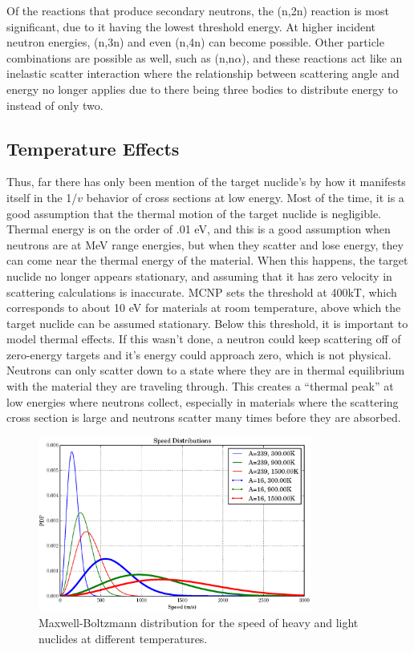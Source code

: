 Of the reactions that produce secondary neutrons, the (n,2n) reaction is most significant, due to it having the lowest threshold energy.  At higher incident neutron energies, (n,3n) and even (n,4n) can become possible.  Other particle combinations are possible as well, such as (n,n$\alpha$), and these reactions act like an inelastic scatter interaction where the relationship between scattering angle and energy no longer applies due to there being three bodies to distribute energy to instead of only two.

\subsection{Temperature Effects}
\label{sec:temp}

Thus, far there has only been mention of the target nuclide's by how it manifests itself in the 1/$v$ behavior of cross sections at low energy.  Most of the time, it is a good assumption that the thermal motion of the target nuclide is negligible.  Thermal energy is on the order of .01 eV, and this is a good assumption when neutrons are at MeV range energies, but when they scatter and lose energy, they can come near the thermal energy of the material.  When this happens, the target nuclide no longer appears stationary, and assuming that it has zero velocity in scattering calculations is inaccurate.  MCNP sets the threshold at 400kT, which corresponds to about 10 eV for materials at room temperature, above which the target nuclide can be assumed stationary.  Below this threshold, it is important to model thermal effects.  If this wasn't done, a neutron could keep scattering off of zero-energy targets and it's energy could approach zero, which is not physical.  Neutrons can only scatter down to a state where they are in thermal equilibrium with the material they are traveling through.  This creates a ``thermal peak'' at low energies where neutrons collect, especially in materials where the scattering cross section is large and neutrons scatter many times before they are absorbed.

\begin{figure}[h!]
  \label{MB_dist}
  \centering
    \includegraphics[width=0.8\textwidth]{graphics/MB_dist.eps}
     \caption{Maxwell-Boltzmann distribution for the speed of heavy and light nuclides at different temperatures.}
\end{figure}


